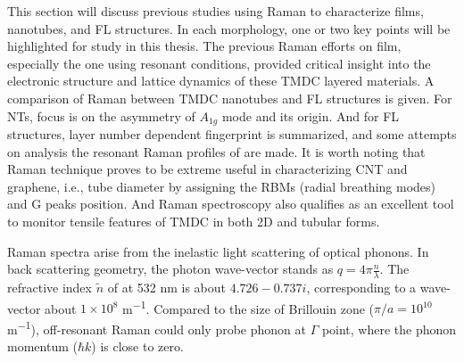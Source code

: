 This section will discuss previous studies using Raman to characterize  films, nanotubes, and FL structures. In each morphology, one or two key points will be highlighted for study in this thesis. The previous Raman efforts on  film, especially the one using resonant conditions, provided critical insight into the electronic structure and lattice dynamics of these TMDC layered materials. A comparison of Raman between TMDC nanotubes and FL structures is given. For  NTs, focus is on the asymmetry of $A_{1g}$ mode and its origin. And for  FL structures, layer number dependent fingerprint is summarized, and some attempts on analysis the resonant Raman profiles of  are made. It is worth noting that Raman technique proves to be extreme useful in characterizing CNT and graphene, i.e., tube diameter by assigning the RBMs (radial breathing modes) and G peaks position.\cite{Bonaccorso2013} And Raman spectroscopy also qualifies as an excellent tool to monitor tensile features of TMDC in both 2D and tubular forms.\cite{Tang2013} 

Raman spectra arise from the inelastic light scattering of optical phonons. In back scattering geometry, the photon wave-vector stands as $q = 4\pi\frac{n}{\lambda}$. The refractive index $\tilde{n}$ of  at 532 nm is about $4.726 - 0.737i$, corresponding to a wave-vector about $1\times10^8$ \si{m^{-1}}. Compared to the size of Brillouin zone ($\pi/a = 10^{10}$\si{m^{-1}}), off-resonant Raman could only probe phonon at $\Gamma$ point, where the phonon momentum ($\hbar k$) is close to zero. 

